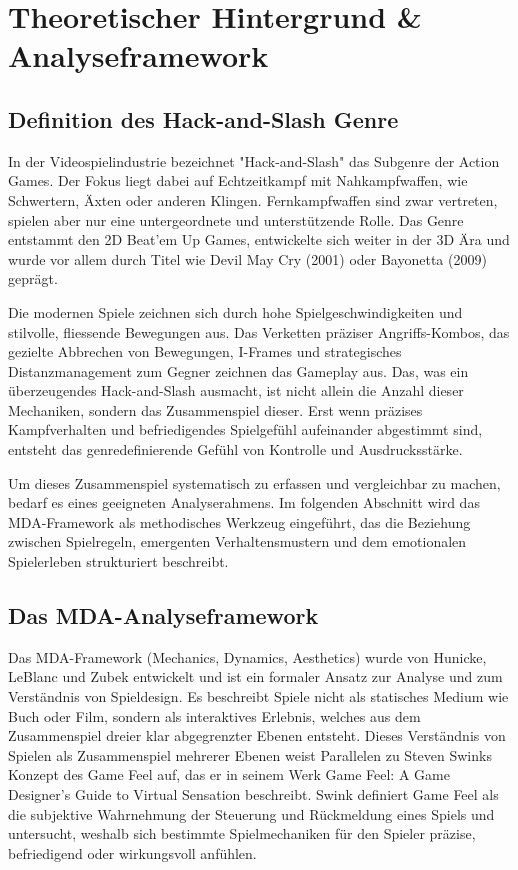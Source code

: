 \documentclass[../Main.tex]{subfiles}
\begin{document}
\section{Theoretischer Hintergrund \& Analyseframework}

\subsection{Definition des Hack-and-Slash Genre}

In der Videospielindustrie bezeichnet "Hack-and-Slash" das Subgenre der Action Games.\autocite{wikipedia_hackandslash} Der Fokus liegt dabei auf Echtzeitkampf mit Nahkampfwaffen, wie Schwertern, Äxten oder anderen Klingen. Fernkampfwaffen sind zwar vertreten, spielen aber nur eine untergeordnete und unterstützende Rolle. Das Genre entstammt den 2D Beat'em Up Games, entwickelte sich weiter in der 3D Ära und wurde vor allem durch Titel wie Devil May Cry (2001)\autocite{wikipedia_devilmaycry} oder Bayonetta (2009)\autocite{wikipedia_bayonetta} geprägt.

Die modernen Spiele zeichnen sich durch hohe Spielgeschwindigkeiten und stilvolle, fliessende Bewegungen aus. Das Verketten präziser Angriffs-Kombos, das gezielte Abbrechen von Bewegungen, I-Frames und strategisches Distanzmanagement zum Gegner zeichnen das Gameplay aus. Das, was ein überzeugendes Hack-and-Slash ausmacht, ist nicht allein die Anzahl dieser Mechaniken, sondern das Zusammenspiel dieser. Erst wenn präzises Kampfverhalten und befriedigendes Spielgefühl aufeinander abgestimmt sind, entsteht das genredefinierende Gefühl von Kontrolle und Ausdrucksstärke.\autocite[s.5-s.7]{lindgren2025striking}

Um dieses Zusammenspiel systematisch zu erfassen und vergleichbar zu machen, bedarf es eines geeigneten Analyserahmens. Im folgenden Abschnitt wird das MDA-Framework als methodisches Werkzeug eingeführt, das die Beziehung zwischen Spielregeln, emergenten Verhaltensmustern und dem emotionalen Spielerleben strukturiert beschreibt.


\subsection{Das MDA-Analyseframework}

Das MDA-Framework (Mechanics, Dynamics, Aesthetics) wurde von Hunicke, LeBlanc und Zubek entwickelt und ist ein formaler Ansatz zur Analyse und zum Verständnis von Spieldesign. Es beschreibt Spiele nicht als statisches Medium wie Buch oder Film, sondern als interaktives Erlebnis, welches aus dem Zusammenspiel dreier klar abgegrenzter Ebenen entsteht. Dieses Verständnis von Spielen als Zusammenspiel mehrerer Ebenen weist Parallelen zu Steven Swinks Konzept des Game Feel auf, das er in seinem Werk Game Feel: A Game Designer’s Guide to Virtual Sensation beschreibt. Swink definiert Game Feel als die subjektive Wahrnehmung der Steuerung und Rückmeldung eines Spiels und untersucht, weshalb sich bestimmte Spielmechaniken für den Spieler präzise, befriedigend oder wirkungsvoll anfühlen.\autocite[s.1-s.6]{swink2008gamefeel}
\end{document}
